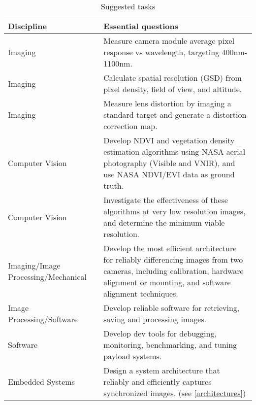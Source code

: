 \documentclass[conference]{IEEEtran} %
\begin{document}
\noindent
\begin{table}[h!]
  \label{tasks}
  \caption{Suggested tasks}
  \centering
\begin{tabularx}{\linewidth}{@{}p{}X@{}}
    \textbf{Discipline} & \textbf{Essential questions} \\
    \midrule
Imaging & Measure camera module average pixel response vs wavelength, targeting 400nm-1100nm. \\
Imaging & Calculate spatial resolution (GSD) from pixel density, field of view, and altitude. \\
Imaging & Measure lens distortion by imaging a standard target and generate a distortion correction map. \\
Computer Vision & Develop NDVI and vegetation density estimation algorithms using NASA aerial photography (Visible and VNIR), and use NASA NDVI/EVI data as ground truth. \\
Computer Vision & Investigate the effectiveness of these algorithms at very low resolution images, and determine the minimum viable resolution. \\
Imaging/Image Processing/Mechanical & Develop the most efficient architecture for reliably differencing images from two cameras, including calibration, hardware alignment or mounting, and software alignment techniques. \\
Image Processing/Software & Develop reliable software for retrieving, saving and processing images. \\
Software & Develop dev tools for debugging, monitoring, benchmarking, and tuning payload systems. \\
Embedded Systems & Design a system architecture that reliably and efficiently captures synchronized images. (see \autoref{architectures}) \\
\end{tabularx}
\end{table}
\end{document}
